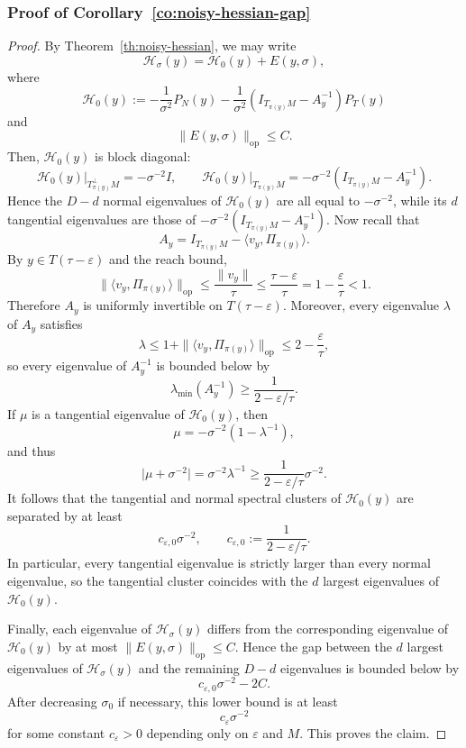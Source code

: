 \documentclass[11pt]{article}
\theoremstyle{plain}
\theoremstyle{definition}
\begin{document}
\subsubsection{Proof of Corollary~\ref{co:noisy-hessian-gap}}\label{sec:pf-noisy hessian gap}
\begin{proof}
By Theorem~\ref{th:noisy-hessian}, we may write
\[
\mathcal H_\sigma(y)= \mathcal H_0(y)+E(y,\sigma),
\]
where
\[
\mathcal H_0(y):=
-\frac{1}{\sigma^2}P_N(y)
-\frac{1}{\sigma^2}(I_{T_{\pi(y)}M}-A_y^{-1})P_T(y)
\]
and 
\[
\|E(y,\sigma)\|_{\mathrm{op}}\le C.
\]
Then, $\mathcal H_0(y)$ is block diagonal:
\[
\mathcal H_0(y)\big|_{T_{\pi(y)}^\perp M}=-\sigma^{-2}I,
\qquad
\mathcal H_0(y)\big|_{T_{\pi(y)}M}=-\sigma^{-2}(I_{T_{\pi(y)}M}-A_y^{-1}).
\]
Hence the $D-d$ normal eigenvalues of $\mathcal H_0(y)$ are all equal to $-\sigma^{-2}$, while its $d$ tangential eigenvalues are those of $-\sigma^{-2}(I_{T_{\pi(y)}M}-A_y^{-1})$.
Now recall that
\[
A_y=I_{T_{\pi(y)}M}-\langle v_y,\Pi_{\pi(y)}\rangle.
\]
By $y\in T(\tau-\varepsilon)$ and the reach bound,
\[
\|\langle v_y,\Pi_{\pi(y)}\rangle\|_{\mathrm{op}}
\le \frac{\|v_y\|}{\tau}
\le \frac{\tau-\varepsilon}{\tau} = 1-\frac{\varepsilon}{\tau}
<1.
\]
Therefore $A_y$ is uniformly invertible on $T(\tau-\varepsilon)$. Moreover, every eigenvalue $\lambda$ of $A_y$ satisfies
\[
\lambda\le 1+\|\langle v_y,\Pi_{\pi(y)}\rangle\|_{\mathrm{op}}
\le 2-\frac{\varepsilon}{\tau},
\]
so every eigenvalue of $A_y^{-1}$ is bounded below by
\[
\lambda_{\min}(A_y^{-1})\ge \frac{1}{2-\varepsilon/\tau}.
\]
If $\mu$ is a tangential eigenvalue of $\mathcal H_0(y)$, then
\[
\mu=-\sigma^{-2}(1-\lambda^{-1}),
\]
and thus
\[
\big|\mu+\sigma^{-2}\big|
=\sigma^{-2}\lambda^{-1}
\ge \frac{1}{2-\varepsilon/\tau}\sigma^{-2}.
\]
It follows that the tangential and normal spectral clusters of $\mathcal H_0(y)$ are separated by at least
\[
c_{\varepsilon,0}\sigma^{-2},
\qquad
c_{\varepsilon,0}:=\frac{1}{2-\varepsilon/\tau}.
\]
In particular, every tangential eigenvalue is strictly larger than every normal eigenvalue, so the tangential cluster coincides with the $d$ largest eigenvalues of $\mathcal H_0(y)$.

Finally, each eigenvalue of $\mathcal H_\sigma(y)$ differs from the corresponding eigenvalue of $\mathcal H_0(y)$ by at most $\|E(y, \sigma)\|_{\mathrm{op}}\le C$. Hence the gap between the $d$ largest eigenvalues of $\mathcal H_\sigma(y)$ and the remaining $D-d$ eigenvalues is bounded below by
\[
c_{\varepsilon,0}\sigma^{-2}-2C.
\]
After decreasing $\sigma_0$ if necessary, this lower bound is at least
\[
c_\varepsilon\sigma^{-2}
\]
for some constant $c_\varepsilon>0$ depending only on $\varepsilon$ and $M$. This proves the claim.
\end{proof}
\end{document}
